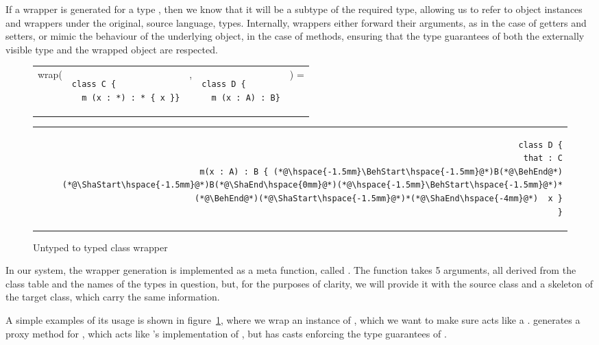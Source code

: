 \documentclass[a4paper,USenglish]{tex/lipics-v2016}
\begin{document}
If a wrapper is generated for a type \C, then we know that it will be a subtype
of the required type, allowing us to refer to object instances and wrappers 
under the original, source language, types. Internally, \kafka wrappers either
forward their arguments, as in the case of getters and setters, or mimic the 
behaviour of the underlying object, in the case of methods, ensuring that the
type guarantees of both the externally visible type and the wrapped object are
respected.


\begin{figure}[!ht]
\begin{tabular}{ER{4.5cm}ER{3.5cm}E}
wrap( & 
\begin{lstlisting}
class C {
  m (x : *) : * { x }}
\end{lstlisting}& , &
\begin{lstlisting}
class D {
  m (x : A) : B}
\end{lstlisting}&) =
\end{tabular}
\begin{tabular}{@{}l@{}r@{}}
\hspace{4.8cm} \,&
\begin{minipage}{\textwidth-5cm}
\begin{lstlisting}
class D {
  that : C
  m(x : A) : B { (*@\hspace{-1.5mm}\BehStart\hspace{-1.5mm}@*)B(*@\BehEnd@*)(*@\ShaStart\hspace{-1.5mm}@*)B(*@\ShaEnd\hspace{0mm}@*)(*@\hspace{-1.5mm}\BehStart\hspace{-1.5mm}@*)*(*@\BehEnd@*)(*@\ShaStart\hspace{-1.5mm}@*)*(*@\ShaEnd\hspace{-4mm}@*)  x }
}
\end{lstlisting}
\end{minipage}
\end{tabular}
\caption{Untyped to typed class wrapper}
\label{fig:rktex1}
\end{figure}

In our system, the wrapper generation is implemented as a meta function, called
. The  function takes 5 arguments, all derived from the class
table and the names of the types in question, but, for the purposes of clarity,
we will provide it with the source class and a skeleton of the target class,
which carry the same information.

A simple examples of its usage is shown in figure~\ref{fig:rktex1}, where we
wrap an instance of \C, which we want to make sure acts like a \D.  
generates a proxy method for \m, which acts like \C's implementation of \m, but
has casts enforcing the type guarantees of \D.
\end{document}
